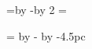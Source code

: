 \newdimen\edgemargin
\newdimen\spinemargin

\def\setspinemargin#1{
  \edgemargin=#1
  \spinemargin=\pdfpagewidth
    \advance\spinemargin by -\hsize
    \advance\spinemargin by -#1
}

\def\leftmargin{\ifodd\pageno\edgemargin\else\spinemargin\fi}

\hsize=22pc %
\leading %
\voffset=\pdfpageheight \advance\voffset by -\vsize \divide\voffset by 2
\topskip=\leading %
\setspinemargin{4.5pc} %
